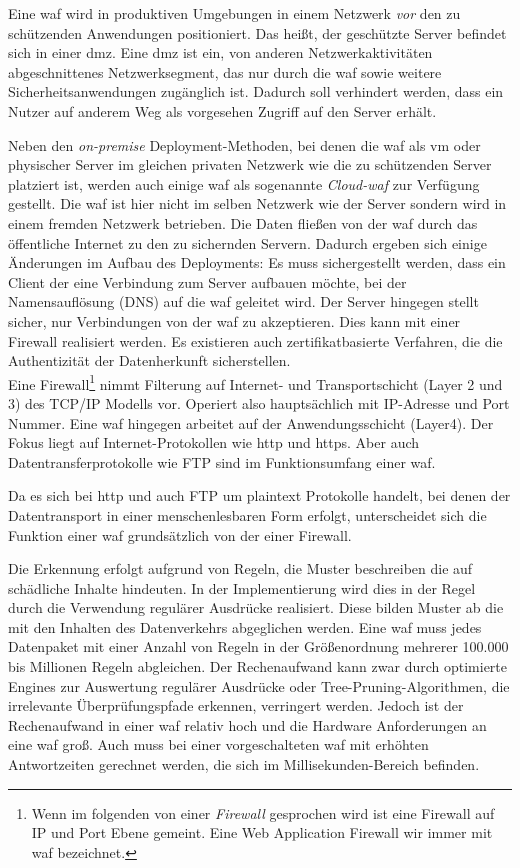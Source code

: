 Eine \ac{waf} wird in produktiven Umgebungen in einem Netzwerk \textit{vor} den zu schützenden Anwendungen positioniert.
Das heißt, der geschützte Server befindet sich in einer \ac{dmz}.
Eine \ac{dmz} ist ein, von anderen Netzwerkaktivitäten abgeschnittenes Netzwerksegment, das nur durch die \ac{waf} sowie weitere Sicherheitsanwendungen zugänglich ist.
Dadurch soll verhindert werden, dass ein Nutzer auf anderem Weg als vorgesehen Zugriff auf den Server erhält.

Neben den \textit{on-premise} Deployment-Methoden, bei denen die \ac{waf} als \ac{vm} oder physischer Server im gleichen privaten Netzwerk wie die zu schützenden Server platziert ist, werden auch einige \ac{waf} als sogenannte \textit{Cloud-\ac{waf}} zur Verfügung gestellt.
Die \ac{waf} ist hier nicht im selben Netzwerk wie der Server sondern wird in einem fremden Netzwerk betrieben.
Die Daten fließen von der \ac{waf} durch das öffentliche Internet zu den zu sichernden Servern.
Dadurch ergeben sich einige Änderungen im Aufbau des Deployments:
Es muss sichergestellt werden, dass ein Client der eine Verbindung zum Server aufbauen möchte, bei der Namensauflösung (DNS) auf die \ac{waf} geleitet wird.
Der Server hingegen stellt sicher, nur Verbindungen von der \ac{waf} zu akzeptieren.
Dies kann mit einer Firewall realisiert werden.
Es existieren auch zertifikatbasierte Verfahren, die die Authentizität der Datenherkunft sicherstellen.\\


Eine Firewall\footnote{Wenn im folgenden von einer \textit{Firewall} gesprochen wird ist eine Firewall auf IP und Port Ebene gemeint. Eine Web Application Firewall wir immer mit \ac{waf} bezeichnet.} nimmt Filterung auf Internet- und Transportschicht (Layer 2 und 3) des TCP/IP Modells vor.
Operiert also hauptsächlich mit IP-Adresse und Port Nummer.
Eine \ac{waf} hingegen arbeitet auf der Anwendungsschicht (Layer4).
Der Fokus liegt auf Internet-Protokollen wie \ac{http} und \ac{https}. 
Aber auch Datentransferprotokolle wie FTP sind im Funktionsumfang einer \ac{waf}.

Da es sich bei \ac{http} und auch FTP um plaintext Protokolle handelt, bei denen der Datentransport in einer menschenlesbaren Form erfolgt, unterscheidet sich die Funktion einer \ac{waf} grundsätzlich von der einer Firewall.

Die Erkennung erfolgt aufgrund von Regeln, die Muster beschreiben die auf schädliche Inhalte hindeuten.
In der Implementierung wird dies in der Regel durch die Verwendung regulärer Ausdrücke realisiert.
Diese bilden Muster ab die mit den Inhalten des Datenverkehrs abgeglichen werden.
Eine \ac{waf} muss jedes Datenpaket mit einer Anzahl von Regeln in der Größenordnung mehrerer 100.000 bis Millionen Regeln abgleichen.
Der Rechenaufwand kann zwar durch optimierte Engines zur Auswertung regulärer Ausdrücke oder Tree-Pruning-Algorithmen, die irrelevante Überprüfungspfade erkennen, verringert werden.
Jedoch ist der Rechenaufwand in einer \ac{waf} relativ hoch und die Hardware Anforderungen an eine \ac{waf} groß.
Auch muss bei einer vorgeschalteten \ac{waf} mit erhöhten Antwortzeiten gerechnet werden, die sich im Millisekunden-Bereich befinden.

